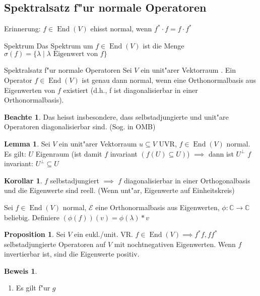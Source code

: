 \documentclass[oneside,fontsize=11pt,paper=a4,BCOR=0mm,DIV=12,automark,headsepline]{scrbook}
\DeclareMathOperator{\mEnd}{End}
\theoremstyle{remark}
\theoremstyle{definition}
\newtheorem*{notte}{Beachte}
\newtheorem*{proposition}{Proposition}
\newtheorem{lemma}{Lemma}[section]
\newtheorem*{korollar}{Korollar}
\theoremstyle{definition}
\newtheorem*{prof}{Beweis}
\theoremstyle{remark}
\begin{document}
\subsection{Spektralsatz f"ur normale Operatoren}
\label{sec:spekt}
Erinnerung: $f\in \mEnd (V)$ ehisst normal, wenn $f^*\cdot f = f\cdot f^*$

\begin{definition}{Spektrum}{}
  Das Spektrum um $f\in \mEnd (V)$ ist die Menge $\sigma (f) = \{\lambda \mid
  \lambda \text{ Eigenwert von } f\}$
\end{definition}

\begin{satz}{Spektralsatz f"ur normale Operatoren}
  Sei $V$ ein unit"arer Vektorraum
  . Ein Operator $f\in \mEnd (V)$ ist genau dann normal, wenn eine
  Orthonormalbasis aus Eigenwerten von $f$ existiert (d.h., f ist
  diagonalisierbar in einer Orthonormalbasis).
\end{satz}

\begin{notte}
  Das heisst insbesondere, dass selbstadjungierte und unit"are Operatoren
  diagonalisierbar sind. (Sog. in OMB)
\end{notte}
\begin{lemma}
  Sei $V$ ein unit"arer Vektorraum $u\subseteq V$ UVR, $f\in \mEnd (V)$ normal. Es
  gilt: $U$ Eigenraum (ist damit $f$ invariant $(f(U)\subseteq U) $) $\implies $ dann ist $U^\perp$
  $f$ invariant:
  $U^\perp\subseteq U$ 
\end{lemma}

\begin{korollar}
  $f$ selbstadjungiert $\implies$ $f$ diagonalisierbar in einer Orthogonalbasis
  und die Eigenwerte sind reell. (Wenn unt"ar, Eigenwerte auf Einheitskreis)
\end{korollar}
\begin{relation}
  Sei $f\in \mEnd (V)$ normal, $\mathcal{E}$ eine Orthonormalbasis aus Eigenwerten,
  $\phi: \mathbb{C} \rightarrow \mathbb{C}$ beliebig. Definiere $(\phi(f))(v)=\phi(\lambda)*v$
\end{relation}

\begin{proposition}
  Sei $V$ ein eukl./unit. VR. $f\in \mEnd (V) \implies f^* f, ff^*$
  selbstadjungierte Operatoren auf $V$ mit nochtnegativen Eigenwerten. Wenn $f$
  invertierbar ist, sind die Eigenwerte positiv.
\end{proposition}

\begin{prof}
  \begin{enumerate}
  \item Es gilt f"ur $g$
  \end{enumerate}
\end{prof}
\end{document}
